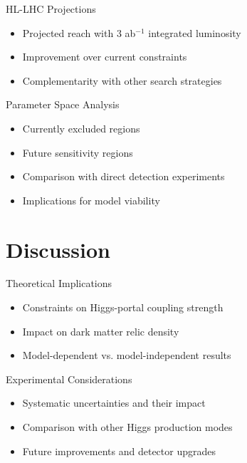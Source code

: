 \documentclass{../../bredelebeamer}
\begin{document}
\begin{frame}{HL-LHC Projections}
    \begin{itemize}
        \item Projected reach with 3 ab$^{-1}$ integrated luminosity
        \item Improvement over current constraints
        \item Complementarity with other search strategies
    \end{itemize}
\end{frame}

\begin{frame}{Parameter Space Analysis}
    \begin{itemize}
        \item Currently excluded regions
        \item Future sensitivity regions
        \item Comparison with direct detection experiments
        \item Implications for model viability
    \end{itemize}
\end{frame}

\section{Discussion}
\begin{frame}{Theoretical Implications}
    \begin{itemize}
        \item Constraints on Higgs-portal coupling strength
        \item Impact on dark matter relic density
        \item Model-dependent vs. model-independent results
    \end{itemize}
\end{frame}

\begin{frame}{Experimental Considerations}
    \begin{itemize}
        \item Systematic uncertainties and their impact
        \item Comparison with other Higgs production modes
        \item Future improvements and detector upgrades
    \end{itemize}
\end{frame}
\end{document}
